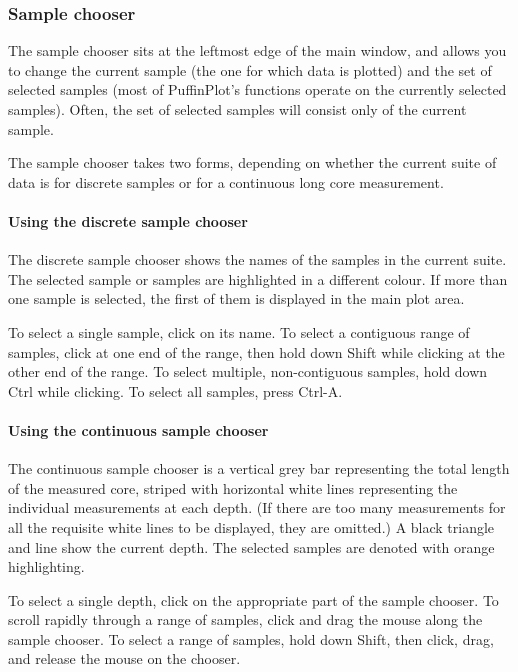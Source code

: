 \documentclass[a4paper]{article}
\newcommand{\ppcmd}[1]{\textsf{#1}} %
\begin{document}
\subsubsection{Sample chooser}

The sample chooser sits at the leftmost edge of the main window, and
allows you to change the current sample (the one for which data is
plotted) and the set of selected samples (most of PuffinPlot's functions
operate on the currently selected samples). Often, the set of selected
samples will consist only of the current sample.

The sample chooser takes two forms, depending on whether the current
suite of data is for discrete samples or for a continuous long core
measurement.

\paragraph{Using the discrete sample chooser}

The discrete sample chooser shows the names of the samples in the current
suite. The selected sample or samples are highlighted in a different colour.
If more than one sample is selected, the first of them is displayed in the
main plot area.

To select a single sample, click on its name. To select a contiguous range of
samples, click at one end of the range, then hold down \ppcmd{Shift} while
clicking at the other end of the range. To select multiple, non-contiguous
samples, hold down \ppcmd{Ctrl} while clicking. To select all samples, press
\ppcmd{Ctrl-A}.

\paragraph{Using the continuous sample chooser}

The continuous sample chooser is a vertical grey bar representing the total
length of the measured core, striped with horizontal white lines representing
the individual measurements at each depth. (If there are too many
measurements for all the requisite white lines to be displayed, they are
omitted.) A black triangle and line show the current depth. The selected
samples are denoted with orange highlighting.

To select a single depth, click on the appropriate part of the sample
chooser. To scroll rapidly through a range of samples, click and drag the
mouse along the sample chooser. To select a range of samples, hold down
\ppcmd{Shift}, then click, drag, and release the mouse on the chooser.
\end{document}
